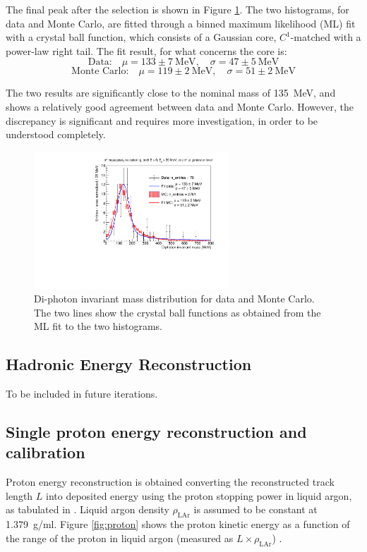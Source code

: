 The final peak after the selection is shown in Figure \ref{fig:pi0_mass_peak}. The two histograms, for data and Monte Carlo, are fitted through a binned maximum likelihood (ML) fit with a crystal ball function, which consists of a Gaussian core, $C^1$-matched with a power-law right tail. The fit result, for what concerns the core is:
\[ \text{Data:} \quad \mu = 133 \pm 7~\text{MeV}, \quad \sigma = 47 \pm 5~\text{MeV} \]
\[ \text{Monte Carlo:} \quad \mu = 119 \pm 2~\text{MeV}, \quad \sigma = 51 \pm 2~\text{MeV} \]

The two results are significantly close to the nominal mass of 135~MeV, and shows a relatively good agreement between data and Monte Carlo. However, the discrepancy is significant and requires more investigation, in order to be understood completely.

\begin{figure}[htbp]
\centering
\includegraphics[width=0.65\textwidth]{figures/pi0_mass_peak_final.pdf}
\caption{Di-photon invariant mass distribution for data and Monte Carlo. The two lines show the crystal ball functions as obtained from the ML fit to the two histograms.} 
\label{fig:pi0_mass_peak}
\end{figure}

\subsection{Hadronic Energy Reconstruction}
To be included in future iterations.

\subsection{Single proton energy reconstruction and calibration}\label{sec:protonenergy}
Proton energy reconstruction is obtained converting the reconstructed track length $L$ into deposited energy using the proton stopping power in liquid argon, as tabulated in \cite{pstar}. Liquid argon density $\rho_{\mathrm{LAr}}$ is assumed to be constant at 1.379~g/ml. Figure \ref{fig:proton} shows the proton kinetic energy as a function of the range of the proton in liquid argon (measured as $L \times \rho_{\mathrm{LAr}}$) .

